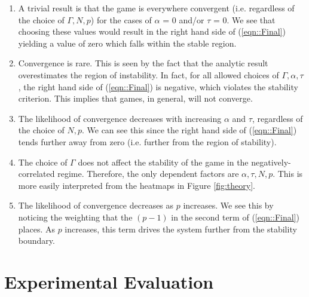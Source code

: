 \documentclass[sigconf]{aamas}
\begin{document}
\begin{enumerate}
    \item A trivial result is that the game is everywhere convergent (i.e. regardless of the choice of $\Gamma, N, p$) for the cases of $\alpha$ = 0 and/or $\tau$ = 0.  We see that choosing these values would result in the right hand side of (\ref{eqn::Final}) yielding a value of zero which falls within the stable region.
    \item Convergence is rare. This is seen by the fact that the analytic result overestimates the region of instability. In fact, for all allowed choices of $\Gamma, \alpha, \tau$, the right hand side of (\ref{eqn::Final}) is negative, which violates the stability criterion. This implies that games, in general, will not converge.
    \item The likelihood of convergence decreases with increasing $\alpha$ and $\tau$, regardless of the choice of $N, p$. We can see this since the right hand side of (\ref{eqn::Final}) tends further away from zero (i.e. further from the region of stability).
    \item The choice of $\Gamma$ does not affect the stability of the game in the negatively-correlated regime. Therefore, the only dependent factors are $\alpha, \tau, N, p$. This is more easily interpreted from the heatmaps in Figure \ref{fig:theory}.
    \item The likelihood of convergence decreases as $p$ increases. We see this by noticing the weighting that the $(p-1)$ in the second term of (\ref{eqn::Final}) places. As $p$ increases, this term drives the system further from the stability boundary.

\end{enumerate}


\section{Experimental Evaluation} \label{sec:exev}
\end{document}
